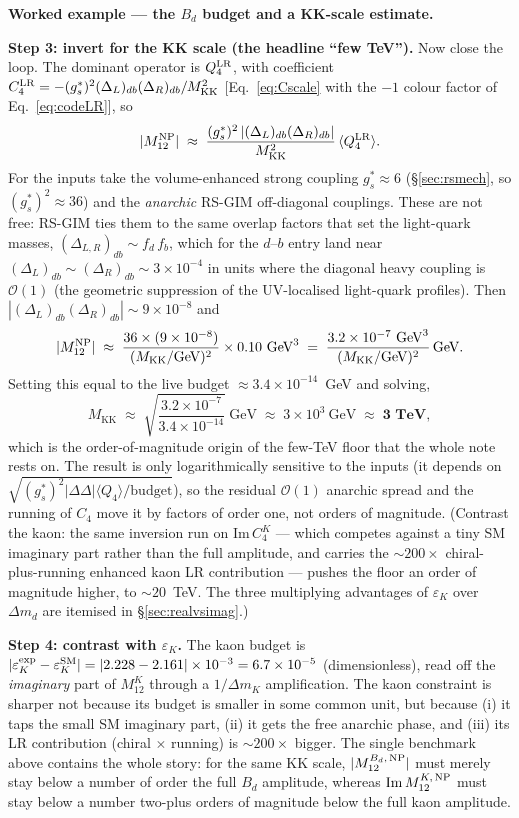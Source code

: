\documentclass[11pt]{article}
\newenvironment{callout}[1]{%
  \par\medskip\begin{shaded}\noindent\textbf{#1}\par\smallskip}{\end{shaded}\medskip}
\newcommand{\MKK}{M_{\mathrm{KK}}}
\newcommand{\Mtwelve}{M_{12}}
\newcommand{\dmd}{\Delta m_d}
\newcommand{\epsK}{\varepsilon_K}
\theoremstyle{definition}
\begin{document}
\begin{callout}{Worked example --- the $B_d$ budget and a KK-scale estimate.}
\textbf{Step 3: invert for the KK scale (the headline ``few TeV'').} Now close the
loop. The dominant operator is $Q_4^{\rm LR}$, with coefficient
$C_4^{\rm LR}=-(g_s^*)^2(\Delta_L)_{db}(\Delta_R)_{db}/\MKK^2$
[Eq.~\eqref{eq:Cscale} with the $-1$ colour factor of Eq.~\eqref{eq:codeLR}], so
\[
|\Mtwelve^{\rm NP}|\;\approx\;\frac{(g_s^*)^2\,|(\Delta_L)_{db}(\Delta_R)_{db}|}{\MKK^2}\,
\langle Q_4^{\rm LR}\rangle .
\]
For the inputs take the volume-enhanced strong coupling $g_s^*\approx6$
(\S\ref{sec:rsmech}, so $(g_s^*)^2\approx36$) and the \emph{anarchic} RS-GIM
off-diagonal couplings. These are not free: RS-GIM ties them to the same overlap
factors that set the light-quark masses, $(\Delta_{L,R})_{db}\sim f_{d}\,f_{b}$,
which for the $d$--$b$ entry land near $(\Delta_L)_{db}\sim(\Delta_R)_{db}\sim
3\times10^{-4}$ in units where the diagonal heavy coupling is $\mathcal{O}(1)$
(the geometric suppression of the UV-localised light-quark profiles). Then
$|(\Delta_L)_{db}(\Delta_R)_{db}|\sim9\times10^{-8}$ and
\[
|\Mtwelve^{\rm NP}|\;\approx\;\frac{36\times(9\times10^{-8})}{(\MKK/\text{GeV})^2}\times0.10~\text{GeV}^3
\;=\;\frac{3.2\times10^{-7}~\text{GeV}^3}{(\MKK/\text{GeV})^2}\,\text{GeV}.
\]
Setting this equal to the live budget $\approx3.4\times10^{-14}$~GeV and solving,
\[
\MKK\;\approx\;\sqrt{\frac{3.2\times10^{-7}}{3.4\times10^{-14}}}~\text{GeV}
\;\approx\;3\times10^{3}~\text{GeV}\;\approx\;\textbf{3 TeV},
\]
which is the order-of-magnitude origin of the few-TeV floor that the whole note
rests on. The result is only logarithmically sensitive to the inputs (it depends
on $\sqrt{(g_s^*)^2|\Delta\Delta|\langle Q_4\rangle/\text{budget}}$), so the
residual $\mathcal{O}(1)$ anarchic spread and the running of $C_4$ move it by
factors of order one, not orders of magnitude. (Contrast the kaon: the same
inversion run on $\mathrm{Im}\,C_4^K$ --- which competes against a tiny SM
imaginary part rather than the full amplitude, and carries the $\sim200\times$
chiral-plus-running enhanced kaon LR contribution --- pushes the floor an order of magnitude higher,
to $\sim20$~TeV. The three multiplying advantages of $\epsK$ over $\dmd$ are
itemised in \S\ref{sec:realvsimag}.)

\textbf{Step 4: contrast with $\epsK$.} The kaon budget is
$|\epsK^{\rm exp}-\epsK^{\rm SM}|=|2.228-2.161|\times10^{-3}=6.7\times10^{-5}$
(dimensionless), read off the \emph{imaginary} part of $\Mtwelve^K$ through a
$1/\Delta m_K$ amplification. The kaon constraint is sharper not because its
budget is smaller in some common unit, but because (i) it taps the small SM
imaginary part, (ii) it gets the free anarchic phase, and (iii) its LR
contribution (chiral $\times$ running) is $\sim$$200\times$ bigger. The single benchmark above contains the whole
story: for the same KK scale, $|M_{12}^{B_d,\,\rm NP}|$ must merely stay below a
number of order the full $B_d$ amplitude, whereas $\mathrm{Im}\,M_{12}^{K,\,\rm NP}$
must stay below a number two-plus orders of magnitude below the full kaon
amplitude.
\end{callout}
\end{document}
